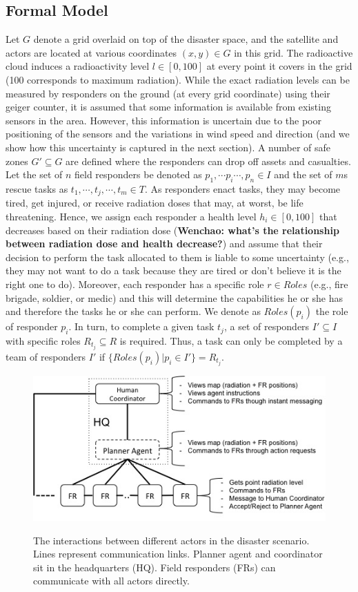 \subsection{Formal Model}
\noindent Let $G$ denote a grid overlaid on top of the disaster space, and the satellite and actors are located at various coordinates $(x,y) \in G$ in this grid. The radioactive cloud induces a radioactivity level  $l \in [0,100]$ at every point it covers in the grid (100 corresponds to maximum radiation). While the exact radiation levels can be measured by responders on the ground (at every grid coordinate) using their geiger counter, it is assumed that some information is available  from existing sensors  in the area. However, this information is uncertain due to the poor positioning of the sensors and the variations in wind speed and direction (and we show how this uncertainty is captured in the next section). A number of safe zones $G' \subseteq G$ are defined where the responders can drop off assets and casualties. Let the set of $n$ field responders be denoted as $p_1, \cdots p_i \cdots, p_n \in I$ and the set of $m$s rescue tasks as  $t_1,\cdots, t_j, \cdots, t_m\in T$.  As responders enact tasks, they may become tired, get injured, or receive radiation doses that may, at worst, be life threatening. Hence, we assign each responder  a health level $h_i\in [0,100]$ that decreases based on their radiation dose (\textbf{Wenchao: what's the relationship between radiation dose and health decrease?}) and assume that their decision to perform the task allocated to them is liable to some uncertainty (e.g., they may not want to do a task because they are tired or don't believe it is the right one to do). Moreover, each responder has  a specific role  $r \in Roles$ (e.g., fire brigade, soldier, or medic) and this will determine the capabilities he or she has and therefore the tasks he or she can perform. We denote as $Roles(p_i)$ the role of responder $p_i$. In turn, to complete a given task $t_j$,  a set of responders $I' \subseteq I$ with specific roles $R_{t_j} \subseteq R$ is required. Thus, a task can only be completed by a team of responders $I'$ if $\{Roles(p_i) | p_i \in I'\} = R_{t_j}$. 
\begin{figure}[htbp]
\includegraphics[width=\columnwidth]{scenario.jpg}
\label{fig:scenario}
\caption{The interactions between different actors in the disaster scenario. Lines represent communication links. Planner agent and coordinator sit in the headquarters (HQ). Field responders (FRs) can communicate with all actors directly.}
\end{figure}
